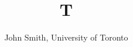 \documentclass{amsart}
\begin{document}
\title{T}
\author{John Smith, University of Toronto}
\maketitle
\end{document}
